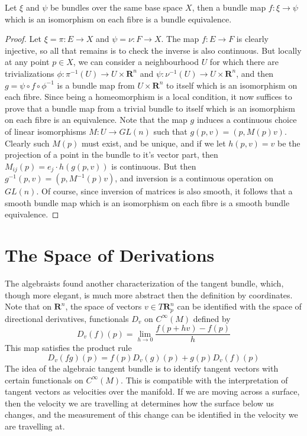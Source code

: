 \begin{theorem}
    Let $\xi$ and $\psi$ be bundles over the same base space $X$, then a bundle map $f: \xi \to \psi$ which is an isomorphism on each fibre is a bundle equivalence.
\end{theorem}
\begin{proof}
    Let $\xi = \pi: E \to X$ and $\psi = \nu: F \to X$. The map $f: E \to F$ is clearly injective, so all that remains is to check the inverse is also continuous. But locally at any point $p \in X$, we can consider a neighbourhood $U$ for which there are trivializations $\phi: \pi^{-1}(U) \to U \times \mathbf{R}^n$ and $\psi: \nu^{-1}(U) \to U \times \mathbf{R}^n$, and then $g = \psi \circ f\circ \phi^{-1}$ is a bundle map from $U \times \mathbf{R}^n$ to itself which is an isomorphism on each fibre. Since being a homeomorphism is a local condition, it now suffices to prove that a bundle map from a trivial bundle to itself which is an isomorphism on each fibre is an equivalence. Note that the map $g$ induces a continuous choice of linear isomorphisms $M: U \to GL(n)$ such that $g(p,v) = (p,M(p)v)$. Clearly such $M(p)$ must exist, and be unique, and if we let $h(p,v) = v$ be the projection of a point in the bundle to it's vector part, then $M_{ij}(p) = e_j \cdot h(g(p,v))$ is continuous. But then $g^{-1}(p,v) = (p,M^{-1}(p)v)$, and inversion is a continuous operation on $GL(n)$. Of course, since inversion of matrices is also smooth, it follows that a smooth bundle map which is an isomorphism on each fibre is a smooth bundle equivalence.
\end{proof}

%
%

\section{The Space of Derivations}

The algebraists found another characterization of the tangent bundle, which, though more elegant, is much more abstract then the definition by coordinates. Note that on $\mathbf{R}^n$, the space of vectors $v \in T\mathbf{R}^n_p$ can be identified with the space of directional derivatives, functionals $D_v$ on $C^\infty(M)$ defined by
%
\[ D_v(f)(p) = \lim_{h \to 0} \frac{f(p + hv) - f(p)}{h} \]
%
This map satisfies the product rule
%
\[ D_v(fg)(p) = f(p) D_v(g)(p) + g(p) D_v(f)(p) \]
%
The idea of the algebraic tangent bundle is to identify tangent vectors with certain functionals on $C^\infty(M)$. This is compatible with the interpretation of tangent vectors as velocities over the manifold. If we are moving across a surface, then the velocity we are travelling at determines how the surface below us changes, and the measurement of this change can be identified in the velocity we are travelling at.

